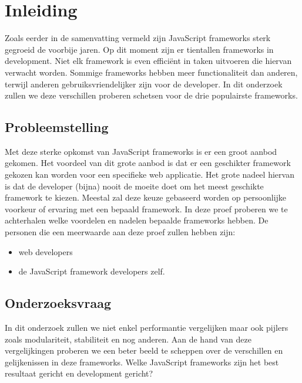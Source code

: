 
\chapter{Inleiding}
\label{ch:inleiding}

Zoals eerder in de samenvatting vermeld zijn JavaScript frameworks sterk gegroeid de voorbije jaren. Op dit moment zijn er tientallen frameworks in development. Niet elk framework is even efficiënt in taken uitvoeren die hiervan verwacht worden. Sommige frameworks hebben meer functionaliteit dan anderen, terwijl anderen gebruiksvriendelijker zijn voor de developer. In dit onderzoek zullen we deze verschillen proberen schetsen voor de drie populairste frameworks.

\section{Probleemstelling}
\label{sec:probleemstelling}

Met deze sterke opkomst van JavaScript frameworks is er een groot aanbod gekomen. Het voordeel van dit grote aanbod is dat er een geschikter framework gekozen kan worden voor een specifieke web applicatie. Het grote nadeel hiervan is dat de developer (bijna) nooit de moeite doet om het meest geschikte framework te kiezen. Meestal zal deze keuze gebaseerd worden op persoonlijke voorkeur of ervaring met een bepaald framework. In deze proef proberen we te achterhalen welke voordelen en nadelen bepaalde frameworks hebben. De personen die een meerwaarde aan deze proef zullen hebben zijn:

\begin{itemize}
	\item web developers
	\item de JavaScript framework developers zelf.
\end{itemize}

\section{Onderzoeksvraag}
\label{sec:onderzoeksvraag}

In dit onderzoek zullen we niet enkel performantie vergelijken maar ook pijlers zoals modulariteit, stabiliteit en nog anderen. Aan de hand van deze vergelijkingen proberen we een beter beeld te scheppen over de verschillen en gelijkenissen in deze frameworks. Welke JavaScript frameworks zijn het best resultaat gericht en development gericht?

